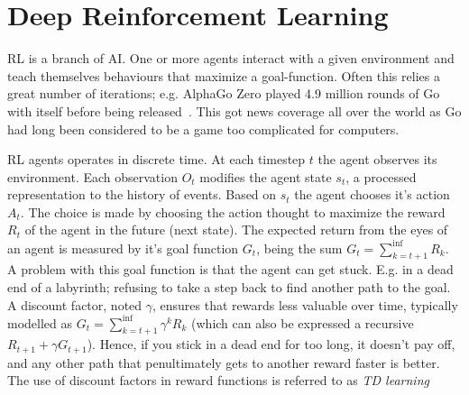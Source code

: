 \documentclass[10pt,twocolumn,letterpaper]{article}
\begin{document}
\section{Deep Reinforcement Learning}

\gls{RL} is a branch of AI. One or more agents interact with a given environment and teach themselves 
behaviours that maximize a goal-function. Often this relies a great number of iterations; e.g. AlphaGo Zero played 4.9 million rounds of Go with itself before being released~\cite{goWithoutHumans}. This got news coverage all over the world as Go had long been considered to be a game too complicated for computers.

\gls{RL} agents operates in discrete time. At each timestep $t$ the agent observes its environment. Each observation $O_{t}$ modifies the agent state $s_{t}$, a processed representation to the history of events. Based on $s_{t}$ the agent chooses it's action $A_{t}$. The choice is made by choosing the action thought to maximize the reward $R_{t}$ of the agent in the future (next state). The expected return from the eyes of an agent is measured by it's goal function $G_{t}$, being the sum $G_{t} = \sum_{k=t+1}^{\inf{}}{R_{k}}$.
A problem with this goal function is that the agent can get stuck. E.g. in a dead end of a labyrinth; refusing to take a step back to find another path to the goal. A discount factor, noted $\gamma{}$, ensures that rewards less valuable over time, typically modelled as $G_{t} = \sum_{k=t+1}^{\inf{}}\gamma^{k}{R_{k}}$ (which can also be expressed a recursive $R_{t+1} + \gamma{G_{t+1}}$). Hence, if you stick in a dead end for too long, it doesn't pay off, and any other path that penultimately gets to another reward faster is better. The use of discount factors in reward functions is referred to as \textit{\gls{TD} learning}
\end{document}
